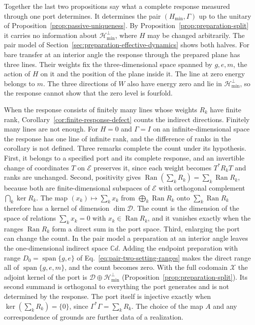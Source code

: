 \documentclass[11pt]{article}
\theoremstyle{definition}
\DeclareMathOperator{\Ran}{Ran}
\DeclareMathOperator{\Span}{span}
\newcommand{\C}{\mathbb C}
\newcommand{\Hmin}{\mathcal H_{\min}}
\begin{document}
Together the last two propositions say what a complete response measured through one port determines. It determines the pair $(H_{\min},\Gamma)$ up to the unitary of Proposition~\ref{prop:passive-uniqueness}. By Proposition~\ref{prop:preparation-split} it carries no information about $\Hmin^\perp$, where $H$ may be changed arbitrarily. The pair model of Section~\ref{sec:preparation-effective-dynamics} shows both halves. For bare transfer at an interior angle the response through the prepared plane has three lines. Their weights fix the three-dimensional space spanned by $g,e,m$, the action of $H$ on it and the position of the plane inside it. The line at zero energy belongs to $m$. The three directions of $W$ also have energy zero and lie in $\Hmin^\perp$, so the response cannot show that the zero level is fourfold.

When the response consists of finitely many lines whose weights $R_k$ have finite rank, Corollary~\ref{cor:finite-response-defect} counts the indirect directions. Finitely many lines are not enough. For $H=0$ and $\Gamma=I$ on an infinite-dimensional space the response has one line of infinite rank, and the difference of ranks in the corollary is not defined. Three remarks complete the count under its hypothesis. First, it belongs to a specified port and its complete response, and an invertible change of coordinates $T$ on $\mathcal E$ preserves it, since each weight becomes $T^*R_kT$ and ranks are unchanged. Second, positivity gives $\Ran(\sum_kR_k)=\sum_k\Ran R_k$, because both are finite-dimensional subspaces of $\mathcal E$ with orthogonal complement $\bigcap_k\ker R_k$. The map $(x_k)\mapsto\sum_kx_k$ from $\bigoplus_k\Ran R_k$ onto $\sum_k\Ran R_k$ therefore has a kernel of dimension $\dim\mathcal D$. The count is the dimension of the space of relations $\sum_kx_k=0$ with $x_k\in\Ran R_k$, and it vanishes exactly when the ranges $\Ran R_k$ form a direct sum in the port space. Third, enlarging the port can change the count. In the pair model a preparation at an interior angle leaves the one-dimensional indirect space $\C d$. Adding the endpoint preparation with range $D_0=\Span\{g,e\}$ of Eq.~\eqref{eq:pair-two-setting-ranges} makes the direct range all of $\Span\{g,e,m\}$, and the count becomes zero. With the full codomain $\mathcal X$ the adjoint kernel of the port is $\mathcal D\oplus\Hmin^\perp$ (Proposition~\ref{prop:preparation-split}). Its second summand is orthogonal to everything the port generates and is not determined by the response. The port itself is injective exactly when $\ker(\sum_kR_k)=\{0\}$, since $\Gamma^*\Gamma=\sum_kR_k$. The choice of the map $A$ and any correspondence of grounds are further data of a realization.
\end{document}
